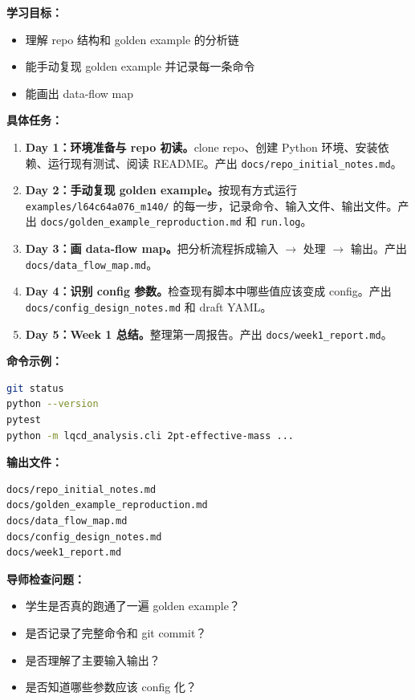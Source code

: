 \documentclass[11pt,a4paper,fontset=fandol]{ctexart}
\begin{document}
\textbf{学习目标：}
\begin{itemize}
  \item 理解 repo 结构和 golden example 的分析链
  \item 能手动复现 golden example 并记录每一条命令
  \item 能画出 data-flow map
\end{itemize}

\textbf{具体任务：}
\begin{enumerate}
  \item \textbf{Day 1：环境准备与 repo 初读。}clone repo、创建 Python 环境、安装依赖、运行现有测试、阅读 README。产出 \texttt{docs/repo\_initial\_notes.md}。
  \item \textbf{Day 2：手动复现 golden example。}按现有方式运行 \lstinline|examples/l64c64a076_m140/| 的每一步，记录命令、输入文件、输出文件。产出 \texttt{docs/golden\_example\_reproduction.md} 和 \texttt{run.log}。
  \item \textbf{Day 3：画 data-flow map。}把分析流程拆成输入 $\to$ 处理 $\to$ 输出。产出 \texttt{docs/data\_flow\_map.md}。
  \item \textbf{Day 4：识别 config 参数。}检查现有脚本中哪些值应该变成 config。产出 \texttt{docs/config\_design\_notes.md} 和 draft YAML。
  \item \textbf{Day 5：Week 1 总结。}整理第一周报告。产出 \texttt{docs/week1\_report.md}。
\end{enumerate}

\textbf{命令示例：}
\begin{lstlisting}[language=bash]
git status
python --version
pytest
python -m lqcd_analysis.cli 2pt-effective-mass ...
\end{lstlisting}

\textbf{输出文件：}
\begin{lstlisting}
docs/repo_initial_notes.md
docs/golden_example_reproduction.md
docs/data_flow_map.md
docs/config_design_notes.md
docs/week1_report.md
\end{lstlisting}

\textbf{导师检查问题：}
\begin{itemize}
  \item 学生是否真的跑通了一遍 golden example？
  \item 是否记录了完整命令和 git commit？
  \item 是否理解了主要输入输出？
  \item 是否知道哪些参数应该 config 化？
\end{itemize}
\end{document}
